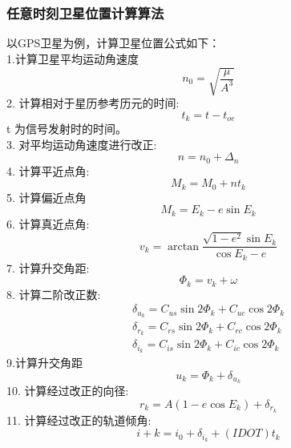 \documentclass{ctexart}
\begin{document}
\subsubsection{任意时刻卫星位置计算算法}
\label{2.6.1}
以GPS卫星为例，计算卫星位置公式如下：\\
1.计算卫星平均运动角速度
\begin{equation}
n_{0}=\sqrt{\frac{\mu}{A^3}}
\end{equation}
2. 计算相对于星历参考历元的时间:
\begin{equation}
t_{k}=t-t_{o e}
\end{equation}
t 为信号发射时的时间。\\
3. 对平均运动角速度进行改正:
\begin{equation}
n=n_{0}+\Delta_{n}
\end{equation}
4. 计算平近点角:
\begin{equation}
M_{k}=M_{0}+n t_{k}
\label{eq:13}
\end{equation}
5. 计算偏近点角
\begin{equation}
M_{k}=E_{k}-e \sin E_{k}
\label{eq:14}
\end{equation}
6. 计算真近点角:
\begin{equation}
v_{k}=\arctan \frac{\sqrt{1-e^{2}} \sin E_{k}}{ \cos E_{k}-e}
\label{eq:15}
\end{equation}
7. 计算升交角距:
\begin{equation}
\Phi_{k}=v_{k}+\omega
\label{eq:16}
\end{equation}
8. 计算二阶改正数:
\begin{equation}
\begin{gathered}
\delta_{u_{k}}=C_{u s} \sin 2 \Phi_{k}+C_{u c} \cos 2 \Phi_{k} \\
\delta_{r_{k}}=C_{r s} \sin 2 \Phi_{k}+C_{r c} \cos 2 \Phi_{k} \\
\delta_{i_{k}}=C_{i s} \sin 2 \Phi_{k}+C_{i c} \cos 2 \Phi_{k}
\label{eq:17}
\end{gathered}
\end{equation}
9.计算升交角距
\begin{equation}
u_k=\Phi_{k}+\delta_{u_{k}}
\label{eq:18}
\end{equation}
10. 计算经过改正的向径:
\begin{equation}
r_{k}=A\left(1-e \cos E_{k}\right)+\delta_{r_{k}}
\label{eq:19}
\end{equation}
11. 计算经过改正的轨道倾角:
\begin{equation}
i+k=i_{0}+\delta_{i_{k}}+(I D O T) t_{k}
\label{eq:20}
\end{equation}
\end{document}
